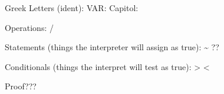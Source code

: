 Greek Letters (ident):
    \alpha
    \beta
    \gamma
    \delta
    \epsilon
    \zeta
    \theta
    \iota
    \kappa
    \lambda
    \nu
    \xi
    \pi
    \rho
    \sigma
    \tau
    \upsilon
    \phi
    \chi
    \psi
    \omega
    VAR:
    \varepsilon
    \vartheta
    \varrho
    \varsigma
    \varphi
    Capitol:
    \Gamma 
    \Delta 
    \Theta 
    \Lambda 
    \Xi
    \Pi 
    \Sigma 
    \Upsilon
    \Phi 
    \Psi 
    \Omega

Operations:
    \pm/\mp
    \setminus
    \cdot
    \times
    \ast
    \star
    \diamond
    \circ
    \bullet
    \div
    \lhd
    \rhd
    \vee
    \wedge
    \oplus
    \ominus
    \otimes
    \oslash
    \cap 
    \cup
    \uplus
    \sqcap
    \sqcup

Statements (things the interpreter will assign as true):
    \equiv
    \sim 
    \simeq
    \supset
    \subset
    \supseteq
    \subseteq
    \parallel
    \perp
    \models
    \cong
    \in
    ??
    \sqsubset
    \sqsupset

Conditionals (things the interpret will test as true):
    \approx
    \leq
    \geq
    >
    <

Proof???
    \forall

